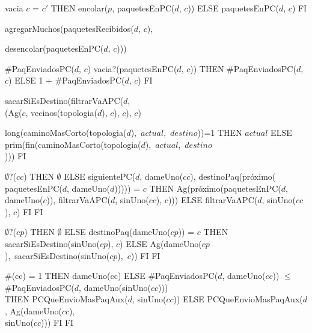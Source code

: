 \begin{tad}{}
	 {vacia}
	 { \IF $c$ = $c'$
																	THEN encolar($p$, paquetesEnPC($d$, $c$))
																	ELSE paquetesEnPC($d$, $c$)
																	FI}	
			  {agregarMuchos(paquetesRecibidos($d$, $c$), 			  
			  
			  \hspace{6.5em}  desencolar(paquetesEnPC($d$, $c$)))}
	
	 {\#PaqEnviadosPC($d$, $c$)}
	 { \IF vacia?(paquetesEnPC($d$, $c$))
															 THEN \#PaqEnviadosPC($d$, $c$)
															 ELSE 1 + \#PaqEnviadosPC($d$, $c$)
															 FI}	
	
	 {sacarSiEsDestino(filtrarVaAPC($d$, \\
												(Ag($c$, vecinos(topologia($d$), $c$), $c$), $c$)}
	
	 {\IF \mbox{long(caminoMasCorto(topologia($d$), $actual$, $destino$))=1}
													   THEN $actual$
													   ELSE \mbox{prim(fin(caminoMasCorto(topologia($d$), $actual$, $destino$}
													   \\)))
													   FI}
	
	 {\IF $\emptyset?$($cc$)
										 	THEN $\emptyset$
										 	ELSE {\IF siguientePC($d$, dameUno($cc$), destinoPaq(próximo(
										 			   paquetesEnPC($d$, dameUno($d$))))) = $c$
										 			THEN Ag(próximo(paquetesEnPC($d$, dameUno($c$)), filtrarVaAPC($d$, sinUno($cc$), $c$)))
										 			ELSE filtrarVaAPC($d$, sinUno($cc$), $c$)
										 			FI}
											 FI}
	
	 {\IF $\emptyset?$($cp$)
											 THEN $\emptyset$
											 ELSE {\IF destinoPaq(dameUno($cp$)) = $c$
											 		THEN sacarSiEsDestino(sinUno($cp$), $c$)
											 		ELSE \mbox{Ag(dameUno($cp$), sacarSiEsDestino(sinUno($cp$), $c$))}
											 		FI}
											 FI} 	
	
	 { \IF \#(cc) = 1
												THEN dameUno(cc)
												ELSE {\IF \#PaqEnviadosPC($d$, dameUno($cc$)) $\leq$ \\
										        		 \hspace*{1.1em}\#PaqEnviadosPC($d$, dameUno(sinUno($cc$)))\\
											 		 THEN PCQueEnvioMasPaqAux($d$, sinUno($cc$))
											 		 ELSE PCQueEnvioMasPaqAux($d$, Ag(dameUno($cc$), \\
											 		 \hspace*{14em}				      sinUno($cc$)))
													 FI}
												FI}
	

\end{tad}

